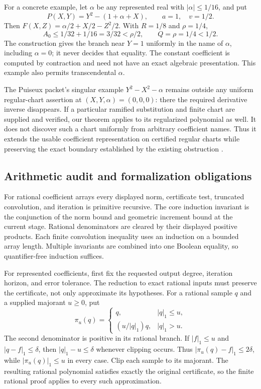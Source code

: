 For a concrete example, let $\alpha$ be any represented real with
$|\alpha|\le1/16$, and put
\[
 P(X,Y)=Y^2-(1+\alpha+X),\qquad a=1,\quad v=1/2.
\]
Then
$F(X,Z)=\alpha/2+X/2-Z^2/2$.
With $R=1/8$ and $\rho=1/4$,
\[
 A_0\le1/32+1/16=3/32<\rho/2,
 \qquad Q=\rho=1/4<1/2.
\]
The construction gives the branch near $Y=1$ uniformly in the name of
$\alpha$, including $\alpha=0$; it never decides that equality.
The constant coefficient is computed by contraction and need not have an
exact algebraic presentation.  This example also permits transcendental
$\alpha$.

The Puiseux packet's singular example
$Y^2-X^2-\alpha$ remains outside any uniform regular-chart assertion at
$(X,Y,\alpha)=(0,0,0)$: there the required derivative inverse disappears.
If a particular ramified substitution and finite chart are supplied and
verified, our theorem applies to its regularized polynomial as well.
It does not discover such a chart uniformly from arbitrary coefficient
names.  Thus it extends the usable coefficient representation on certified
regular charts while preserving the exact boundary established by the
existing obstruction \cite{repoObstruction}.

\subsection{Arithmetic audit and formalization obligations}

For rational coefficient arrays every displayed norm, certificate test,
truncated convolution, and iteration is primitive recursive.  The core
induction invariant is the conjunction of the norm bound and geometric
increment bound at the current stage.  Rational denominators are cleared
by their displayed positive products.  Each finite convolution inequality
uses an induction on a bounded array length.  Multiple invariants are
combined into one Boolean equality, so quantifier-free induction suffices.

For represented coefficients, first fix the requested output degree,
iteration horizon, and error tolerance.  The reduction to exact rational
inputs must preserve the certificate, not only approximate its hypotheses.
For a rational sample $q$ and a supplied majorant $u\ge0$, put
\[
 \pi_u(q)=
 \begin{cases}
 q,&|q|_1\le u,\\
 (u/|q|_1)q,&|q|_1>u.
 \end{cases}
\]
The second denominator is positive in its rational branch.  If
$|f|_1\le u$ and $|q-f|_1\le\delta$, then
$|q|_1-u\le\delta$ whenever clipping occurs.  Thus
$|\pi_u(q)-f|_1\le2\delta$, while $|\pi_u(q)|_1\le u$ in every case.
Clip each sample to its majorant.  The resulting rational polynomial
satisfies exactly the original certificate, so the finite rational proof
applies to every such approximation.

